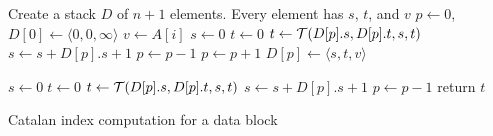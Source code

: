 \begin{algorithm}
\SetAlgoNoLine
{}
Create a stack $D$ of $n+1$ elements.  Every element has $s$, $t$, and $v$ \;
$p \gets 0$, $D[0] \gets \langle 0,0,\infty \rangle$ \;
 {
  $v \gets A[i]$ \; $s \gets 0$ \; $t \gets 0$ \;
   {
    $t \gets {\cal T}(D[p].s, D[p].t, s, t)$ \;
    $s \gets s + D[p].s + 1$ \;
    $p \gets p - 1$ \;
  }
  $p \gets p + 1$ \;
  $D[p] \gets \langle s,t,{v}\rangle$ \;
}

$s \gets 0 \; t \gets 0$ \;
 {
  $t \gets {\cal T}(D[p].s, D[p].t, s, t)$ \;
  $s \gets s + D[p].s + 1$ \;
  $p \gets p - 1$ \;
}
return $t$ \;

\caption{Catalan index computation for a data block}
\label{alg:cartesian-encode-offline}
\end{algorithm}
